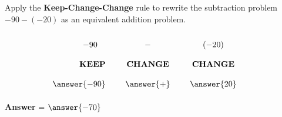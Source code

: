 \documentclass{ximera}[font=12pt]
\begin{document}
\begin{problem}
    Apply the \textbf{Keep-Change-Change} rule to rewrite the subtraction problem $-90 -(-20)$ as an equivalent 
    addition problem.  

    \[
    \renewcommand{\arraystretch}{2}
    \begin{array}{r @{\hskip 24pt} c @{\hskip 24pt} c @{\hskip 24pt} c}
    -90 \quad & - & (-20) \\
    \textbf{KEEP} & \textbf{CHANGE} & \textbf{CHANGE} \\
    \answer{-90} & \answer{+} & \answer{20}
    \end{array}
    \]

\textcolor{orange!80!black}{\textbf{Answer}} = $\answer{-70}$
                                                   
\end{problem}    
\end{document}
